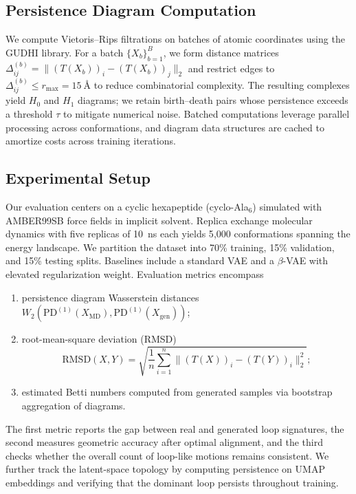\documentclass[11pt]{article}
\begin{document}
\subsection{Persistence Diagram Computation}
We compute Vietoris--Rips filtrations on batches of atomic coordinates using the GUDHI library. For a batch $\{X_b\}_{b=1}^B$, we form distance matrices $\Delta^{(b)}_{ij} = \| (T(X_b))_i - (T(X_b))_j \|_2$ and restrict edges to $\Delta^{(b)}_{ij} \leq r_{\max} = 15~\text{\AA}$ to reduce combinatorial complexity. The resulting complexes yield $H_0$ and $H_1$ diagrams; we retain birth--death pairs whose persistence exceeds a threshold $\tau$ to mitigate numerical noise. Batched computations leverage parallel processing across conformations, and diagram data structures are cached to amortize costs across training iterations.

\subsection{Experimental Setup}
Our evaluation centers on a cyclic hexapeptide (cyclo-Ala$_6$) simulated with AMBER99SB force fields in implicit solvent. Replica exchange molecular dynamics with five replicas of 10~ns each yields 5{,}000 conformations spanning the energy landscape. We partition the dataset into 70\% training, 15\% validation, and 15\% testing splits. Baselines include a standard VAE and a $\beta$-VAE with elevated regularization weight. Evaluation metrics encompass
\begin{enumerate}[label=\roman*)]
    \item persistence diagram Wasserstein distances $W_{2}(\mathrm{PD}^{(1)}(X_{\text{MD}}), \mathrm{PD}^{(1)}(X_{\text{gen}}))$;
    \item root-mean-square deviation (RMSD)
    \begin{equation}
        \mathrm{RMSD}(X, Y) = \sqrt{\frac{1}{n} \sum_{i=1}^n \big\| (T(X))_i - (T(Y))_i \big\|_2^2};
        \label{eq:rmsd}
    \end{equation}
    \item estimated Betti numbers computed from generated samples via bootstrap aggregation of diagrams.
\end{enumerate}
The first metric reports the gap between real and generated loop signatures, the second measures geometric accuracy after optimal alignment, and the third checks whether the overall count of loop-like motions remains consistent. We further track the latent-space topology by computing persistence on UMAP embeddings and verifying that the dominant loop persists throughout training.
\end{document}
